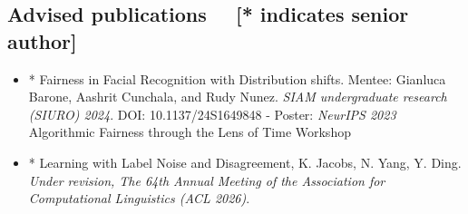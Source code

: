 \documentclass[11pt,a4paper,roman]{moderncv}
\begin{document}
\subsection{Advised publications \small{\ \ [* indicates senior author]}}
\begin{itemize}
\vspace{3pt}
\item * Fairness in Facial Recognition with Distribution shifts. Mentee: Gianluca Barone, Aashrit Cunchala, and Rudy Nunez. \textit{SIAM undergraduate research (SIURO) 2024}. DOI: 10.1137/24S1649848
\vspace{1pt}
\hspace{0.5cm}- Poster: \textit{NeurIPS 2023} Algorithmic Fairness through the Lens of Time Workshop
\vspace{3pt}
\item * Learning with Label Noise and Disagreement, K. Jacobs, N. Yang, Y. Ding. \textit{Under revision, The 64th Annual Meeting of the Association for Computational Linguistics (ACL 2026)}.
\end{itemize}


\end{document}
